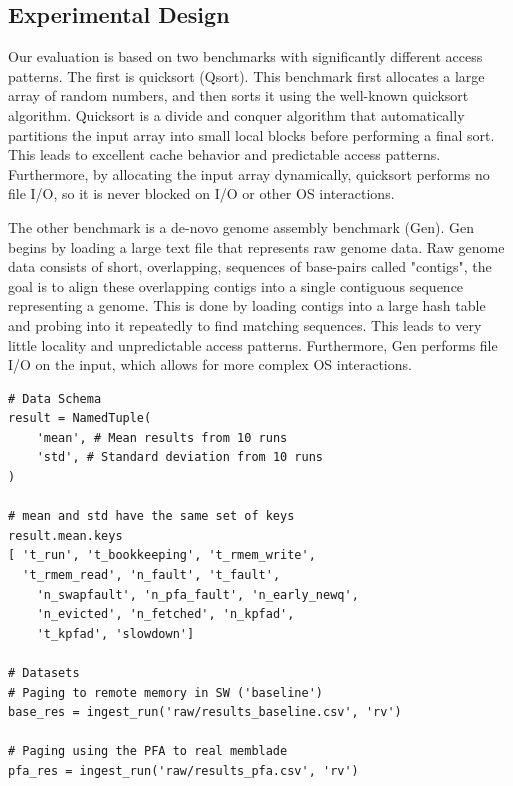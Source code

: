 \subsection{Experimental Design} \label{sec:expDesign}
  Our evaluation is based on two benchmarks with significantly different access
  patterns. The first is quicksort (Qsort). This benchmark first allocates a
  large array of random numbers, and then sorts it using the well-known
  quicksort algorithm.  Quicksort is a divide and conquer algorithm that
  automatically partitions the input array into small local blocks before
  performing a final sort. This leads to excellent cache behavior and
  predictable access patterns.  Furthermore, by allocating the input array
  dynamically, quicksort performs no file I/O, so it is never blocked on I/O or
  other OS interactions.

  The other benchmark is a de-novo genome assembly benchmark (Gen). Gen begins
  by loading a large text file that represents raw genome data. Raw genome data
  consists of short, overlapping, sequences of base-pairs called "contigs", the
  goal is to align these overlapping contigs into a single contiguous sequence
  representing a genome. This is done by loading contigs into a large hash
  table and probing into it repeatedly to find matching sequences. This leads
  to very little locality and unpredictable access patterns. Furthermore, Gen
  performs file I/O on the input, which allows for more complex OS
  interactions.
\newline
\newline
  \begin{lstlisting}[frame=single]
# Data Schema
result = NamedTuple(
	'mean', # Mean results from 10 runs
	'std', # Standard deviation from 10 runs
)

# mean and std have the same set of keys
result.mean.keys
[ 't_run', 't_bookkeeping', 't_rmem_write',
  't_rmem_read', 'n_fault', 't_fault',
	'n_swapfault', 'n_pfa_fault', 'n_early_newq',
	'n_evicted', 'n_fetched', 'n_kpfad',
	't_kpfad', 'slowdown']

# Datasets
# Paging to remote memory in SW ('baseline')
base_res = ingest_run('raw/results_baseline.csv', 'rv')

# Paging using the PFA to real memblade
pfa_res = ingest_run('raw/results_pfa.csv', 'rv')

  \end{lstlisting}


